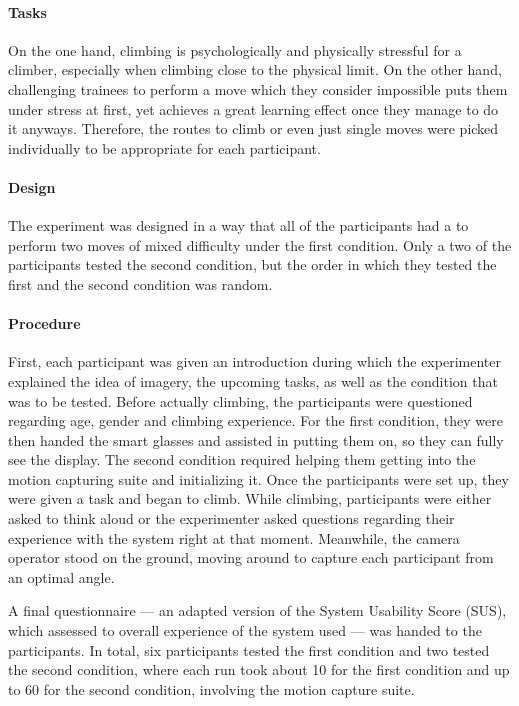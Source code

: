 \paragraph{Tasks}

On the one hand, climbing is psychologically and physically stressful for a climber, especially when climbing close to the physical limit. On the other hand, challenging trainees to perform a move which they consider impossible puts them under stress at first, yet achieves a great learning effect once they manage to do it anyways. Therefore, the routes to climb or even just single moves were picked individually to be appropriate for each participant.
\paragraph{Design}

The experiment was designed in a way that all of the participants had a to perform two moves of mixed difficulty under the first condition. Only a two of the participants tested the second condition, but the order in which they tested the first and the second condition was random.
\paragraph{Procedure}

First, each participant was given an introduction during which the experimenter explained the idea of imagery, the upcoming tasks, as well as the condition that was to be tested. Before actually climbing, the participants were questioned regarding age, gender and climbing experience. For the first condition, they were then handed the smart glasses and assisted in putting them on, so they can fully see the display. The second condition required helping them getting into the motion capturing suite and initializing it. Once the participants were set up, they were given a task and began to climb. While climbing, participants were either asked to think aloud or the experimenter asked questions regarding their experience with the system right at that moment. Meanwhile, the camera operator stood on the ground, moving around to capture each participant from an optimal angle.

A final questionnaire --- an adapted version of the System Usability Score (SUS), which assessed to overall experience of the system used --- was handed to the participants. In total, six participants tested the first condition and two tested the second condition, where each run took about \SI{10}{\min} for the first condition and up to \SI{60}{\min} for the second condition, involving the motion capture suite.
